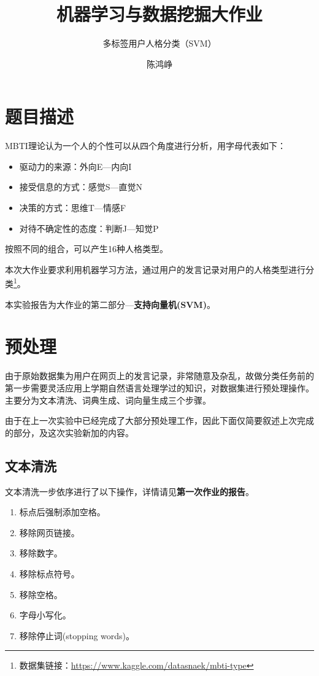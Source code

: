 \documentclass[logo,reportComp]{thesis}
\title{机器学习与数据挖掘大作业}
\subtitle{多标签用户人格分类（SVM）}
\author{陈鸿峥}
\begin{document}
\maketitle
\tableofcontents

\newpage
\section{题目描述}
MBTI理论认为一个人的个性可以从四个角度进行分析，用字母代表如下：
\begin{itemize}
    \item 驱动力的来源：外向E---内向I
    \item 接受信息的方式：感觉S---直觉N
    \item 决策的方式：思维T---情感F
    \item 对待不确定性的态度：判断J---知觉P
\end{itemize}
按照不同的组合，可以产生16种人格类型。

本次大作业要求利用机器学习方法，通过用户的发言记录对用户的人格类型进行分类\footnote{数据集链接：\url{https://www.kaggle.com/datasnaek/mbti-type}}。

本实验报告为大作业的第二部分---\textbf{支持向量机(SVM)}。

\section{预处理}
由于原始数据集为用户在网页上的发言记录，非常随意及杂乱，故做分类任务前的第一步需要灵活应用上学期自然语言处理学过的知识，对数据集进行预处理操作。
主要分为文本清洗、词典生成、词向量生成三个步骤。

由于在上一次实验中已经完成了大部分预处理工作，因此下面仅简要叙述上次完成的部分，及这次实验新加的内容。

\subsection{文本清洗}
文本清洗一步依序进行了以下操作，详情请见\textbf{第一次作业的报告}。
\begin{enumerate}
	\item 标点后强制添加空格。
	\item 移除网页链接。
	\item 移除数字。
	\item 移除标点符号。
	\item 移除空格。
	\item 字母小写化。
	\item 移除停止词(stopping words)。
\end{enumerate}
\end{document}
